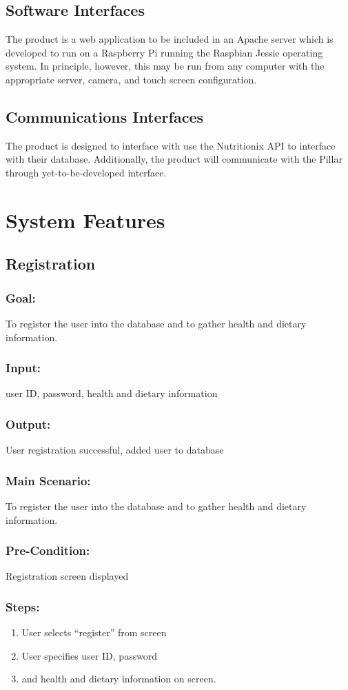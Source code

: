 \subsection{Software Interfaces} The product is a web application to be included in an Apache server which is developed to run on a Raspberry Pi running the Raspbian Jessie operating system. In principle, however, this may be run from any computer with the appropriate server, camera, and touch screen configuration. 

\subsection{Communications Interfaces} The product is designed to interface with use the Nutritionix API to interface with their database. Additionally, the product will communicate with the Pillar through yet-to-be-developed interface. 

\section{System Features}
	\subsection{Registration}
	\subsubsection{Goal:} To register the user into the database and to gather health and dietary information. 
	\subsubsection{Input:} user ID, password, health and dietary information
	\subsubsection{Output:} User registration successful, added user to database
	\subsubsection{Main Scenario:} To register the user into the database and to gather health and dietary information. 
	\subsubsection{Pre-Condition:} Registration screen displayed
	\subsubsection{Steps:} 
\begin{enumerate}\setlength\itemsep{-1em}
	\item User selects ``register'' from screen\\
	\item User specifies user ID, password\\
	\item and health and dietary information on screen. 
\end{enumerate}
